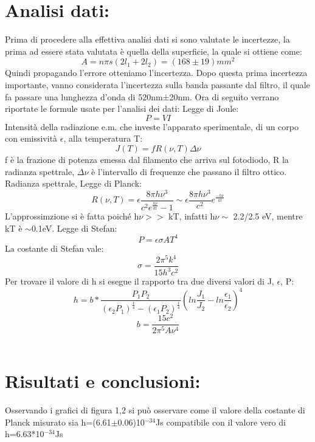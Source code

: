 \documentclass{article}
\begin{document}
\section{Analisi dati:}
Prima di procedere alla effettiva analisi dati si sono valutate le incertezze, la prima ad essere stata valutata è quella della superficie, la quale si ottiene come:
\begin{equation}
    A=n\pi s(2l_{1}+2l_{2})=(168\pm 19)mm^{2}
\end{equation}
Quindi propagando l'errore otteniamo l'incertezza. Dopo questa prima incertezza importante, vanno considerata l'incertezza sulla banda passante dal filtro, il quale fa passare una lunghezza d'onda di 520nm±20nm. Ora di seguito verrano riportate le formule usate per l'analisi dei dati:
Legge di Joule:
\begin{equation}
    P=VI
\end{equation}
Intensità della radiazione e.m. che investe l'apparato sperimentale, di un corpo con emissività $\epsilon$, alla temperatura T:
\begin{equation}
    J(T)=fR(\nu,T)\Delta\nu
\end{equation}
f è la frazione di potenza emessa dal filamento che arriva sul fotodiodo, R la radianza spettrale, $\Delta\nu$ è l'intervallo di frequenze che passano il filtro ottico.
Radianza spettrale, Legge di Planck:
\begin{equation}
    R(\nu,T)=\epsilon\frac{8\pi h\nu^3}{c^2e^\frac{h\nu}{kt}-1} \sim \epsilon\frac{8\pi h\nu^3}{c^2}e^\frac{-h\nu}{kt}
\end{equation}
L'approssimzione si è fatta poiché h$\nu>>$  kT, infatti h$\nu\sim$ 2.2/2.5 eV, mentre kT è $\sim$0.1eV.
Legge di Stefan:
\begin{equation}
    P=\epsilon\sigma AT^4
\end{equation}
La costante di Stefan vale:
\begin{equation}
    \sigma=\frac{2\pi^5k^4}{15h^3c^2}
\end{equation}
Per trovare il valore di h si esegue il rapporto tra due diversi valori di J, $\epsilon$, P:
\begin{equation}
    h=b*\frac{P_{1}P_{2}}{(\epsilon_2P_1)^\frac{1}{4}-(\epsilon_1P_2)^\frac{1}{4}}(ln\frac{J_1}{J_2}-ln\frac{\epsilon_1}{\epsilon_2})^4
\end{equation}
\begin{equation}
    b=\frac{15c^2}{2\pi^5 A\nu^4}
\end{equation}
~
\section{Risultati e conclusioni:}
Osservando i grafici di figura 1,2 si può osservare come il valore della costante di Planck misurato sia h=(6.61$\pm$0.06)10$^{-34}$Js
compatibile con il valore vero di h=6.63*10$^{-34}$Js
~
\end{document}
